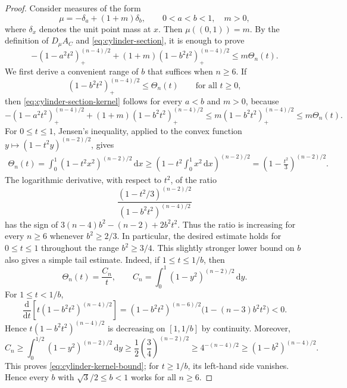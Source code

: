 \documentclass[11pt]{article}
\theoremstyle{remark}
\newcommand{\dd}{\,\mathrm{d}}
\newcommand{\pos}[1]{(#1)_{+}}
\begin{document}
\begin{proof}
Consider measures of the form
\[
 \mu=-\delta_a+(1+m)\delta_b,
 \qquad 0<a<b<1,\quad m>0,
\]
where $\delta_x$ denotes the unit point mass at $x$.  Then
$\mu((0,1))=m$.  By the definition of
$D_\mu A_C$ and \eqref{eq:cylinder-section}, it is enough to prove
\begin{equation}\label{eq:cylinder-section-kernel}
 -\pos{1-a^2t^2}^{(n-4)/2}
 +(1+m)\pos{1-b^2t^2}^{(n-4)/2}
 \leq m\Theta_n(t).
\end{equation}
We first derive a convenient range of $b$ that suffices when $n\geq6$.  If
\begin{equation}\label{eq:cylinder-kernel-bound}
 \pos{1-b^2t^2}^{(n-4)/2}\leq \Theta_n(t)
 \qquad\text{for all }t\geq0,
\end{equation}
then \eqref{eq:cylinder-section-kernel} follows for every $a<b$ and $m>0$,
because
\[
-\pos{1-a^2t^2}^{(n-4)/2}
   +(1+m)\pos{1-b^2t^2}^{(n-4)/2}
\leq m\pos{1-b^2t^2}^{(n-4)/2}
 \leq m\Theta_n(t).
\]
For $0\leq t\leq1$, Jensen's inequality, applied to the convex function
$y\mapsto(1-t^2y)^{(n-2)/2}$, gives
\[
 \begin{aligned}
 \Theta_n(t)
 =\int_0^1(1-t^2x^2)^{(n-2)/2}\dd x\geq
 \left(1-t^2\int_0^1x^2\dd x\right)^{(n-2)/2}
 =\left(1-\frac{t^2}{3}\right)^{(n-2)/2}.
 \end{aligned}
\]
The logarithmic derivative, with respect
to $t^2$, of the ratio
\[
 \frac{(1-t^2/3)^{(n-2)/2}}
      {(1-b^2t^2)^{(n-4)/2}}
\]
has the sign of $
 3(n-4)b^2-(n-2)+2b^2t^2.$ 
Thus the ratio is increasing for every $n\geq6$ whenever $b^2\geq2/3$.
In particular, the desired estimate holds for $0\leq t\leq1$ throughout
the range $b^2\geq3/4$.  This slightly stronger
lower bound on $b$ also gives a simple tail estimate.  Indeed, if
$1\leq t\leq1/b$, then
\[
 \Theta_n(t)=\frac{C_n}{t},\qquad
 C_n=\int_0^1(1-y^2)^{(n-2)/2}\dd y.
\]
For $1\leq t<1/b$,
\[
 \frac{\mathrm d}{\mathrm dt}
 \left[t(1-b^2t^2)^{(n-4)/2}\right]
 =
 (1-b^2t^2)^{(n-6)/2}
 \bigl(1-(n-3)b^2t^2\bigr)<0.
\]
Hence $t(1-b^2t^2)^{(n-4)/2}$ is decreasing on
$[1,1/b]$ by continuity. Moreover,
\[
 C_n\geq\int_0^{1/2}(1-y^2)^{(n-2)/2}\dd y
 \geq\frac12\left(\frac34\right)^{(n-2)/2}
 \geq4^{-(n-4)/2}\geq(1-b^2)^{(n-4)/2}.
\]
This proves \eqref{eq:cylinder-kernel-bound}; for $t\geq1/b$, its left-hand
side vanishes.  Hence every $b$ with $\sqrt3/2\leq b<1$ works for all
$n\geq6$.


\end{proof}
\end{document}
